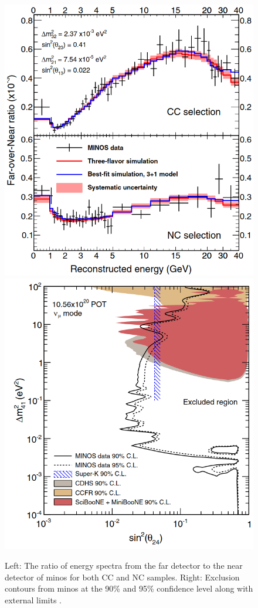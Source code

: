 \begin{figure}[h!]
    \centering
    \includegraphics[width = \smallfigwidth]{figures-chap2/minos_spectra.png}
    \includegraphics[width = \smallfigwidth]{figures-chap2/minos_contour.png}
    \caption[Ratio of energy spectra in the far and near detector of \gls{minos} plus exclusion contours ($\sin^2{\theta_{24}}$, $\Delta m^2_{41}$) space.]{Left: The ratio of energy spectra from the far detector to the near detector of \gls{minos} for both CC and NC samples. Right: Exclusion contours from \gls{minos} at the 90\% and 95\% confidence level along with external limits \cite{MINOS}.}
    \label{fig:minos_spectra_contour}
\end{figure}

